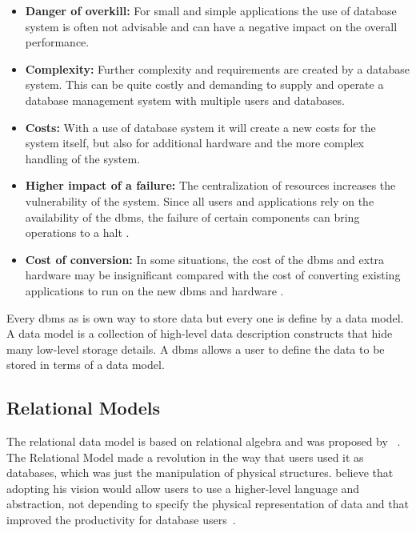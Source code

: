 \begin{itemize}
    \item \textbf{Danger of overkill:} For small and simple applications the use of database system is often not advisable and can have a negative impact on the overall performance. 
    \item \textbf{Complexity:} Further complexity and requirements are created by a database system. This can be quite costly and demanding to supply and operate a database management system with multiple users and databases.
    \item \textbf{Costs:} With a use of database system it will create a new costs for the system itself, but also for additional hardware and the more complex handling of the system.
    \item \textbf{Higher impact of a failure:} The centralization of resources increases the vulnerability of the system. Since all users and applications rely on the availability of the \gls{dbms}, the failure of certain components can bring operations to a halt \cite{begg}.
    \item \textbf{Cost of conversion:} In some situations, the cost of the \gls{dbms} and extra hardware may be insignificant compared with the cost of converting existing applications to run on the new \gls{dbms} and hardware \cite{begg}.
\end{itemize}


Every \gls{dbms} as is own way to store data but every one is define by a data model. A data model is a collection of high-level data description constructs that hide many low-level storage details. A \gls{dbms} allows a user to define the data to be stored in terms of a data model.


\subsection{Relational Models}


 The relational data model is based on relational algebra and was proposed by \citeauthor{codd}~\cite{codd}.
    The Relational Model made a revolution in the way that users used it as databases, which was just the manipulation of physical structures. \citeauthor{codd} believe that adopting his vision would allow users to use a higher-level language and abstraction, not depending to specify the physical representation of data and that improved the productivity for database users~\cite{codd2}.
    
